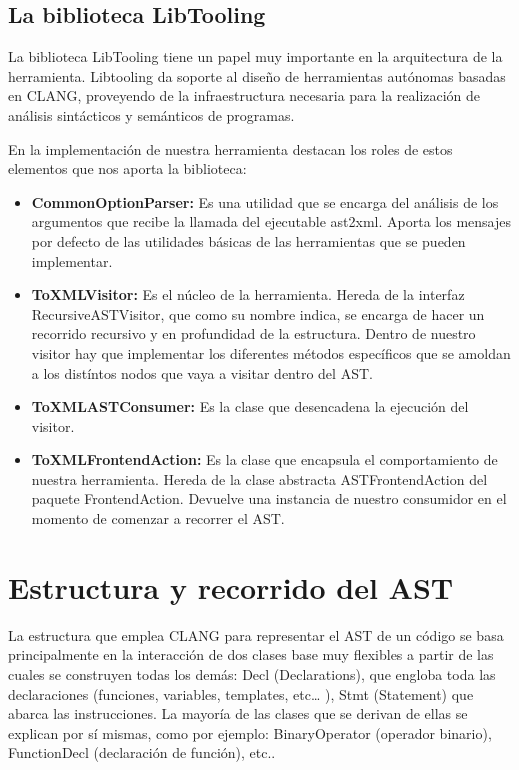 \subsection{La biblioteca LibTooling}

La biblioteca LibTooling tiene un papel muy importante en la arquitectura de la herramienta. Libtooling da soporte al diseño de herramientas aut\'onomas basadas en CLANG, proveyendo de la infraestructura necesaria para la realizaci\'on de an\'alisis sint\'acticos y sem\'anticos de programas.

En la implementaci\'on de nuestra herramienta destacan los roles de estos elementos que nos aporta la biblioteca:

\begin{itemize}
\item \textbf{CommonOptionParser:} Es una utilidad que se encarga del an\'alisis de
los argumentos que recibe la llamada del ejecutable ast2xml. Aporta los
mensajes por defecto de las utilidades b\'asicas de las herramientas que
se pueden implementar.
\item \textbf{ToXMLVisitor:} Es el n\'ucleo de la herramienta. Hereda de la interfaz RecursiveASTVisitor, que como su nombre indica, se encarga de hacer un recorrido recursivo y en profundidad de la estructura. Dentro de nuestro visitor hay que implementar los diferentes m\'etodos espec\'ificos que se amoldan a los dist\'intos nodos que vaya a visitar dentro del AST.
\item \textbf{ToXMLASTConsumer:} Es la clase que desencadena la ejecuci\'on del visitor.
\item \textbf{ToXMLFrontendAction:} Es la clase que encapsula el comportamiento de nuestra herramienta. Hereda de la clase abstracta ASTFrontendAction del paquete FrontendAction. Devuelve una instancia de nuestro consumidor en el momento de comenzar a recorrer el AST.
\end{itemize}

\section{Estructura y recorrido del AST}

La estructura que emplea CLANG para representar el AST de un c\'odigo se basa principalmente en la interacci\'on de dos clases base muy flexibles a partir de las cuales se construyen todas los dem\'as: Decl (Declarations), que engloba toda las declaraciones (funciones, variables, templates, etc… ), Stmt (Statement) que abarca las instrucciones. La mayor\'ia de las clases que se derivan de ellas se explican por s\'i mismas, como por ejemplo: BinaryOperator (operador binario), FunctionDecl (declaraci\'on de funci\'on), etc..

